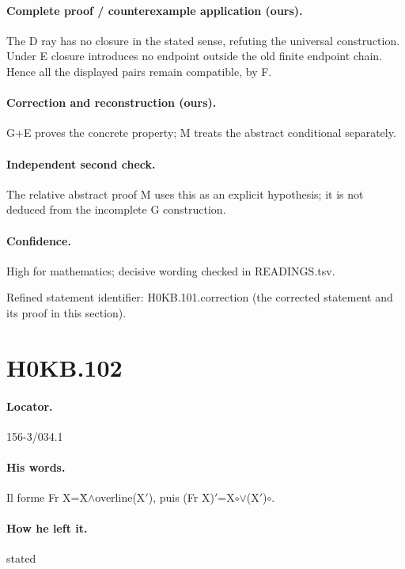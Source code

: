 \paragraph{Complete proof / counterexample application (ours).} The D ray has no closure in the stated sense, refuting the universal construction. Under E closure introduces no endpoint outside the old finite endpoint chain. Hence all the displayed pairs remain compatible, by F.

\paragraph{Correction and reconstruction (ours).} G+E proves the concrete property; M treats the abstract conditional separately.

\paragraph{Independent second check.} The relative abstract proof M uses this as an explicit hypothesis; it is not deduced from the incomplete G construction.

\paragraph{Confidence.} High for mathematics; decisive wording checked in READINGS.tsv.

\noindent Refined statement identifier: H0KB.101.correction (the corrected statement and its proof in this section).

\section*{H0KB.102}\label{statement:H0KB.102}
\paragraph{Locator.} 156-3/034.1

\paragraph{His words.} Il forme Fr X=X̄\ensuremath{\wedge}overline(X\ensuremath{\prime}), puis (Fr X)\ensuremath{\prime}=X\ensuremath{\circ}\ensuremath{\vee}(X\ensuremath{\prime})\ensuremath{\circ}.

\paragraph{How he left it.} stated

